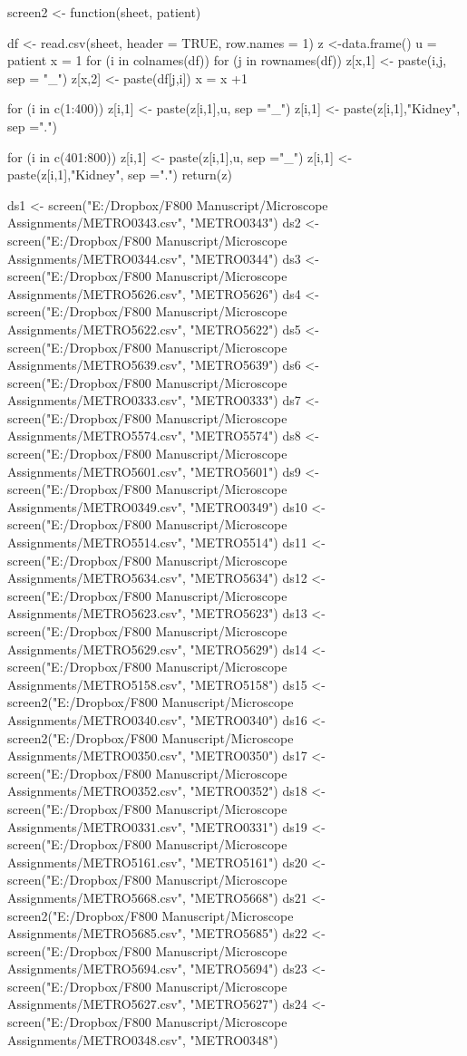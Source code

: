 \documentclass[10pt]{article}
\begin{document}
screen2 <- function(sheet, patient) {
  df <- read.csv(sheet, header = TRUE, row.names = 1)
  z <-data.frame()
  u = patient
  x = 1
  for (i in colnames(df)) {
    for (j in rownames(df)) {
      z[x,1] <- paste(i,j, sep = "_")
      z[x,2] <- paste(df[j,i])
      x = x +1
    }
  }
  
  for (i in c(1:400)){
    z[i,1] <- paste(z[i,1],u, sep ="_")
    z[i,1] <- paste(z[i,1],"Kidney", sep =".")
  }
  
  for (i in c(401:800)){
    z[i,1] <- paste(z[i,1],u, sep ="_")
    z[i,1] <- paste(z[i,1],"Kidney", sep =".")
  }
  return(z)
}

ds1 <- screen("E:/Dropbox/F800 Manuscript/Microscope Assignments/METRO0343.csv", "METRO0343")
ds2 <- screen("E:/Dropbox/F800 Manuscript/Microscope Assignments/METRO0344.csv", "METRO0344")
ds3 <- screen("E:/Dropbox/F800 Manuscript/Microscope Assignments/METRO5626.csv", "METRO5626")
ds4 <- screen("E:/Dropbox/F800 Manuscript/Microscope Assignments/METRO5622.csv", "METRO5622")
ds5 <- screen("E:/Dropbox/F800 Manuscript/Microscope Assignments/METRO5639.csv", "METRO5639")
ds6 <- screen("E:/Dropbox/F800 Manuscript/Microscope Assignments/METRO0333.csv", "METRO0333")
ds7 <- screen("E:/Dropbox/F800 Manuscript/Microscope Assignments/METRO5574.csv", "METRO5574")
ds8 <- screen("E:/Dropbox/F800 Manuscript/Microscope Assignments/METRO5601.csv", "METRO5601")
ds9 <- screen("E:/Dropbox/F800 Manuscript/Microscope Assignments/METRO0349.csv", "METRO0349")
ds10 <- screen("E:/Dropbox/F800 Manuscript/Microscope Assignments/METRO5514.csv", "METRO5514")
ds11 <- screen("E:/Dropbox/F800 Manuscript/Microscope Assignments/METRO5634.csv", "METRO5634")
ds12 <- screen("E:/Dropbox/F800 Manuscript/Microscope Assignments/METRO5623.csv", "METRO5623")
ds13 <- screen("E:/Dropbox/F800 Manuscript/Microscope Assignments/METRO5629.csv", "METRO5629")
ds14 <- screen("E:/Dropbox/F800 Manuscript/Microscope Assignments/METRO5158.csv", "METRO5158")
ds15 <- screen2("E:/Dropbox/F800 Manuscript/Microscope Assignments/METRO0340.csv", "METRO0340")
ds16 <- screen2("E:/Dropbox/F800 Manuscript/Microscope Assignments/METRO0350.csv", "METRO0350")
ds17 <- screen("E:/Dropbox/F800 Manuscript/Microscope Assignments/METRO0352.csv", "METRO0352")
ds18 <- screen("E:/Dropbox/F800 Manuscript/Microscope Assignments/METRO0331.csv", "METRO0331")
ds19 <- screen("E:/Dropbox/F800 Manuscript/Microscope Assignments/METRO5161.csv", "METRO5161")
ds20 <- screen("E:/Dropbox/F800 Manuscript/Microscope Assignments/METRO5668.csv", "METRO5668")
ds21 <- screen2("E:/Dropbox/F800 Manuscript/Microscope Assignments/METRO5685.csv", "METRO5685")
ds22 <- screen("E:/Dropbox/F800 Manuscript/Microscope Assignments/METRO5694.csv", "METRO5694")
ds23 <- screen("E:/Dropbox/F800 Manuscript/Microscope Assignments/METRO5627.csv", "METRO5627")
ds24 <- screen("E:/Dropbox/F800 Manuscript/Microscope Assignments/METRO0348.csv", "METRO0348")
\end{document}
